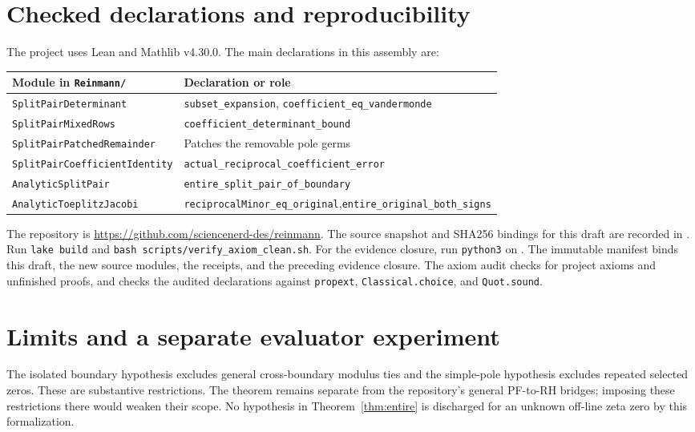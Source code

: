 \documentclass[11pt]{amsart}
\begin{document}
\section{Checked declarations and reproducibility}
The project uses Lean and Mathlib v4.30.0. The main declarations in this assembly are:
\begin{center}\footnotesize
\begin{tabular}{p{}p{}}
\toprule
Module in \texttt{Reinmann/} & Declaration or role\\
\midrule
\texttt{SplitPairDeterminant} & \texttt{subset\_expansion}, \texttt{coefficient\_eq\_vandermonde}\\
\texttt{SplitPairMixedRows} & \texttt{coefficient\_determinant\_bound}\\
\texttt{SplitPairPatchedRemainder} & Patches the removable pole germs\\
\texttt{SplitPairCoefficientIdentity} & \texttt{actual\_reciprocal\_coefficient\_error}\\
\texttt{AnalyticSplitPair} & \texttt{entire\_split\_pair\_of\_boundary}\\
\texttt{AnalyticToeplitzJacobi} & \texttt{reciprocalMinor\_eq\_original},\newline \texttt{entire\_original\_both\_signs}\\
\bottomrule
\end{tabular}
\end{center}
\begingroup\raggedright
The repository is \url{https://github.com/sciencenerd-des/reinmann}.
The source snapshot and SHA256 bindings for this draft are recorded in
.
Run \texttt{lake build} and \texttt{bash scripts/verify\_axiom\_clean.sh}.
For the evidence closure, run \texttt{python3} on
.
The immutable manifest binds this draft, the new source modules, the receipts, and the preceding evidence closure. The axiom audit checks for project axioms and unfinished proofs, and checks the audited declarations against
\texttt{propext}, \texttt{Classical.choice}, and \texttt{Quot.sound}.\par\endgroup

\section{Limits and a separate evaluator experiment}
The isolated boundary hypothesis excludes general cross-boundary modulus ties and the simple-pole hypothesis excludes repeated selected zeros. These are substantive restrictions. The theorem remains separate from the repository's general PF-to-RH bridges; imposing these restrictions there would weaken their scope. No hypothesis in Theorem~\ref{thm:entire} is discharged for an unknown off-line zeta zero by this formalization.
\end{document}
